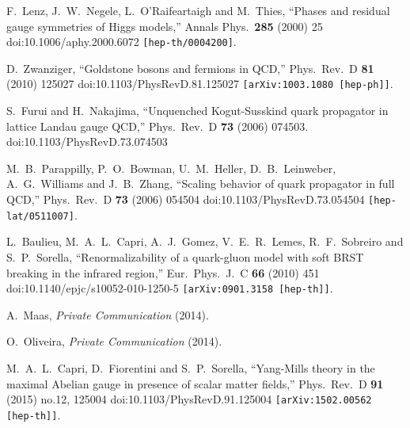 \documentclass[a4paper,11pt,british,twosides]{book}%
\numberwithin{equation}{section}
\begin{document}
\begin{thebibliography}{9}
  F.~Lenz, J.~W.~Negele, L.~O'Raifeartaigh and M.~Thies,
  ``Phases and residual gauge symmetries of Higgs models,''
  Annals Phys.\  {\bf 285} (2000) 25
  doi:10.1006/aphy.2000.6072
  {\tt [hep-th/0004200]}.

  D.~Zwanziger,
  ``Goldstone bosons and fermions in QCD,''
  Phys.\ Rev.\ D {\bf 81} (2010) 125027
  doi:10.1103/PhysRevD.81.125027
  {\tt [arXiv:1003.1080 [hep-ph]]}.
  
  S.~Furui and H.~Nakajima,
  ``Unquenched Kogut-Susskind quark propagator in lattice Landau gauge QCD,''
  Phys.\ Rev.\ D {\bf 73} (2006) 074503.
  doi:10.1103/PhysRevD.73.074503



  M.~B.~Parappilly, P.~O.~Bowman, U.~M.~Heller, D.~B.~Leinweber, A.~G.~Williams and
  J.~B.~Zhang,
  ``Scaling behavior of quark propagator in full QCD,''
  Phys.\ Rev.\ D {\bf 73} (2006) 054504
  doi:10.1103/PhysRevD.73.054504
  {\tt [hep-lat/0511007]}.

  L.~Baulieu, M.~A.~L.~Capri, A.~J.~Gomez, V.~E.~R.~Lemes, R.~F.~Sobreiro and S.~P.~Sorella,
  ``Renormalizability of a quark-gluon model with soft BRST breaking in the infrared region,''
  Eur.\ Phys.\ J.\ C {\bf 66} (2010) 451
  doi:10.1140/epjc/s10052-010-1250-5
  {\tt [arXiv:0901.3158 [hep-th]]}.

 A.~Maas, {\it Private Communication} (2014).

 O.~Oliveira, {\it Private Communication} (2014).

  M.~A.~L.~Capri, D.~Fiorentini and S.~P.~Sorella,
  ``Yang-Mills theory in the maximal Abelian gauge in presence of scalar matter fields,''
  Phys.\ Rev.\ D {\bf 91} (2015) no.12,  125004
  doi:10.1103/PhysRevD.91.125004
  {\tt [arXiv:1502.00562 [hep-th]]}.


\end{thebibliography}
\end{document}
